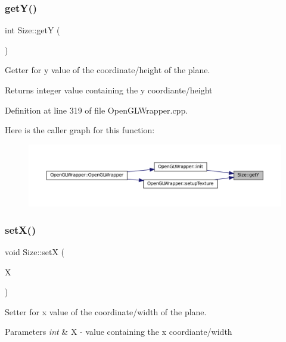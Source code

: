 \subsubsection{\texorpdfstring{getY()}{getY()}}
{\footnotesize\ttfamily int Size\+::getY (\begin{DoxyParamCaption}{ }\end{DoxyParamCaption})}



Getter for y value of the coordinate/height of the plane. 

\begin{DoxyReturn}{Returns}
integer value containing the y coordiante/height 
\end{DoxyReturn}


Definition at line 319 of file Open\+G\+L\+Wrapper.\+cpp.

Here is the caller graph for this function\+:\nopagebreak
\begin{figure}[H]
\begin{center}
\leavevmode
\includegraphics[width=350pt]{classSize_aea85ae41eda5b85e61b72b3f9b1b4799_icgraph}
\end{center}
\end{figure}
\mbox{\label{classSize_a555a455ea033f7ec3173c9bda30a896d}} 
\subsubsection{\texorpdfstring{setX()}{setX()}}
{\footnotesize\ttfamily void Size\+::setX (\begin{DoxyParamCaption}\item[{int}]{X }\end{DoxyParamCaption})}



Setter for x value of the coordinate/width of the plane. 


\begin{DoxyParams}{Parameters}
{\em int} & X -\/ value containing the x coordiante/width \\
\hline
\end{DoxyParams}


